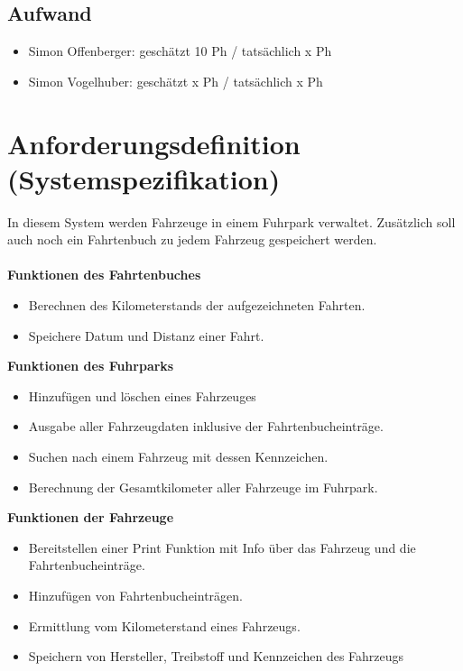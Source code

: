 \documentclass[12pt,naustrian,a4widepaper]{scrartcl}
\begin{document}
\subsection{Aufwand}
	
	\begin{itemize}
		\item Simon Offenberger: geschätzt 10 Ph / tatsächlich x Ph
		\item Simon Vogelhuber:  geschätzt x Ph / tatsächlich x Ph
	\end{itemize}

\clearpage
\section{Anforderungsdefinition (Systemspezifikation)}
In diesem System werden Fahrzeuge in einem Fuhrpark verwaltet. 
Zusätzlich soll auch noch ein Fahrtenbuch zu jedem Fahrzeug gespeichert werden.
\\
\\
\textbf{Funktionen des Fahrtenbuches}
\begin{itemize}
	\item Berechnen des Kilometerstands der aufgezeichneten Fahrten.
	\item Speichere Datum und Distanz einer Fahrt.
\end{itemize}

\textbf{Funktionen des Fuhrparks}
\begin{itemize}
	\item Hinzufügen und löschen eines Fahrzeuges
	\item Ausgabe aller Fahrzeugdaten inklusive der Fahrtenbucheinträge.
	\item Suchen nach einem Fahrzeug mit dessen Kennzeichen.
	\item Berechnung der Gesamtkilometer aller Fahrzeuge im Fuhrpark.
\end{itemize}

\textbf{Funktionen der Fahrzeuge}
\begin{itemize}
	\item Bereitstellen einer Print Funktion mit Info über das Fahrzeug und die Fahrtenbucheinträge.
	\item Hinzufügen von Fahrtenbucheinträgen.
	\item Ermittlung vom Kilometerstand eines Fahrzeugs.
	\item Speichern von Hersteller, Treibstoff und Kennzeichen des Fahrzeugs
\end{itemize}
\end{document}
